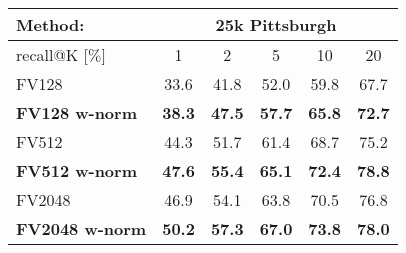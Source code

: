 
	\begin{tabularx}{0.864\linewidth}{|l|c c c c c|}
		\hline 
		\rowcolor{maroon!50}
		Method: & \multicolumn{5}{c|}{25k Pittsburgh} \\
		\hline 
		\hline 
		\rowcolor{maroon!50}
		recall@K [$\%$] & 1 & 2 & 5 & 10 & 20 \\
		\hline
		\rowcolor{maroon!10}
		FV128         & 33.6  & 41.8  & 52.0 & 59.8   & 67.7  \\
		\rowcolor{maroon!10}
		\textbf{FV128 w-norm}     & \textbf{38.3}   & \textbf{47.5} & \textbf{57.7} & \textbf{65.8} & \textbf{72.7}  \\
    \hline  
    \rowcolor{maroon!10}
    FV512         & 44.3 & 51.7   & 61.4  & 68.7   & 75.2  \\
    \rowcolor{maroon!10}
    \textbf{FV512 w-norm}   & \textbf{47.6}  & \textbf{55.4} & \textbf{65.1} & \textbf{72.4} & \textbf{78.8}  \\
    \hline
		\rowcolor{maroon!10}
		FV2048        & 46.9  & 54.1  & 63.8  & 70.5    & 76.8 \\
		\rowcolor{maroon!10}
        \rowcolor{maroon!10}
        \textbf{FV2048 w-norm}  & \textbf{50.2} & \textbf{57.3} & \textbf{67.0} & \textbf{73.8} & \textbf{78.0} \\
        \hline
\end{tabularx}
